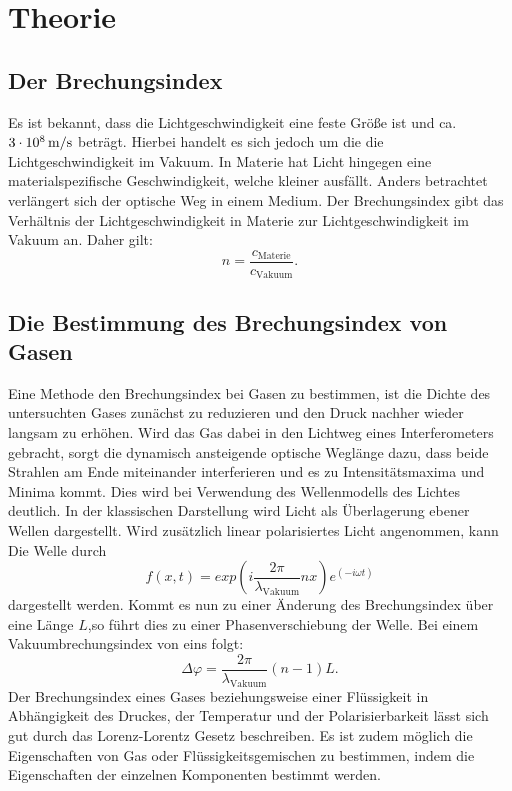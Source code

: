 
\section{Theorie}
\label{sec:Theorie}
\subsection{Der Brechungsindex}
Es ist bekannt, dass die Lichtgeschwindigkeit eine feste Größe ist und ca. $\SI{3 E8}{\meter\per\second}$ beträgt. Hierbei handelt es sich jedoch um die die Lichtgeschwindigkeit im Vakuum. In Materie hat Licht hingegen eine materialspezifische Geschwindigkeit, welche kleiner ausfällt. Anders betrachtet verlängert sich der optische Weg in einem Medium. Der Brechungsindex gibt das Verhältnis der Lichtgeschwindigkeit in Materie zur Lichtgeschwindigkeit im Vakuum an. Daher gilt:
\begin{equation}
    n = \frac{c_\text{Materie}}{c_\text{Vakuum}} \label{eq:n} \text{.}
\end{equation}  

 \subsection{Die Bestimmung des Brechungsindex von Gasen}
 Eine Methode den Brechungsindex bei Gasen zu bestimmen, ist die Dichte des untersuchten Gases zunächst zu reduzieren und den Druck nachher wieder langsam zu erhöhen. Wird das Gas dabei in den Lichtweg eines Interferometers gebracht, sorgt die dynamisch ansteigende optische Weglänge dazu, dass beide Strahlen am Ende miteinander interferieren und es zu Intensitätsmaxima und Minima kommt. Dies wird bei Verwendung des Wellenmodells des Lichtes deutlich. 
 In der klassischen Darstellung wird Licht als Überlagerung ebener Wellen dargestellt. Wird zusätzlich linear polarisiertes Licht angenommen, kann Die Welle durch
 \begin{equation}
    f(x,t) = exp(i \frac{2 \pi}{\lambda_\text{Vakuum}} n x ) e^{(-i \omega t)} \label{eq:ebeneWelle}
 \end{equation}
dargestellt werden. Kommt es nun zu einer Änderung des Brechungsindex über eine Länge $L$,so führt dies zu einer Phasenverschiebung der Welle. Bei einem Vakuumbrechungsindex von eins folgt:
\begin{equation}
    \Delta \varphi = \frac{2 \pi}{\lambda_\text{Vakuum}} (n-1) L \text{.} \label{eq:Deltaphi}
\end{equation}
Der Brechungsindex eines Gases beziehungsweise einer Flüssigkeit in Abhängigkeit des Druckes, der Temperatur und der Polarisierbarkeit lässt sich gut durch das Lorenz-Lorentz Gesetz beschreiben. Es ist zudem möglich die Eigenschaften von Gas oder Flüssigkeitsgemischen zu bestimmen, indem die Eigenschaften der einzelnen Komponenten bestimmt werden.

